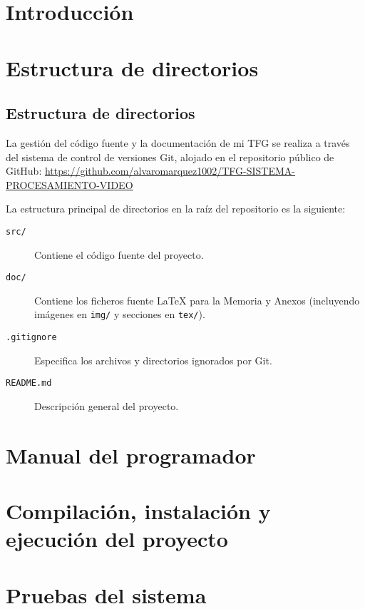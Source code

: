 
\section{Introducción}



\section{Estructura de directorios}
\subsection{Estructura de directorios}

La gestión del código fuente y la documentación de mi TFG se realiza a través del sistema de control de versiones Git, alojado en el repositorio público de GitHub:
\url{https://github.com/alvaromarquez1002/TFG-SISTEMA-PROCESAMIENTO-VIDEO}

La estructura principal de directorios en la raíz del repositorio es la siguiente:

\begin{description}
    \item[\texttt{src/}] Contiene el código fuente del proyecto.
    \item[\texttt{doc/}] Contiene los ficheros fuente LaTeX para la Memoria y Anexos (incluyendo imágenes en \texttt{img/} y secciones en \texttt{tex/}).
    \item[\texttt{.gitignore}] Especifica los archivos y directorios ignorados por Git.
    \item[\texttt{README.md}] Descripción general del proyecto.
\end{description}



\section{Manual del programador}

\section{Compilación, instalación y ejecución del proyecto}

\section{Pruebas del sistema}
